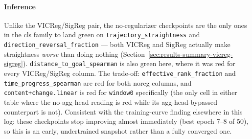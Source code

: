 \paragraph{Inference} Unlike the VICReg/SigReg pair, the no-regularizer checkpoints are
the only ones in the cls family to land green on \texttt{trajectory\_straightness} and
\texttt{direction\_reversal\_fraction} --- both VICReg and SigReg actually make
straightness \emph{worse} than doing nothing (Section~\ref{sec:results-summary-vicreg-sigreg}).
\texttt{distance\_to\_goal\_spearman} is also green here, where it was red for every
VICReg/SigReg column. The trade-off: \texttt{effective\_rank\_fraction} and
\texttt{time\_progress\_spearman} are red for both noreg columns, and
\texttt{content+change.linear} is red for \texttt{window0} specifically (the only cell
in either table where the no-agg-head reading is red while its agg-head-bypassed
counterpart is not). Consistent with the training-curve finding elsewhere in this log:
these checkpoints stop improving almost immediately (best epoch 7--8 of 50), so this is
an early, undertrained snapshot rather than a fully converged one.
